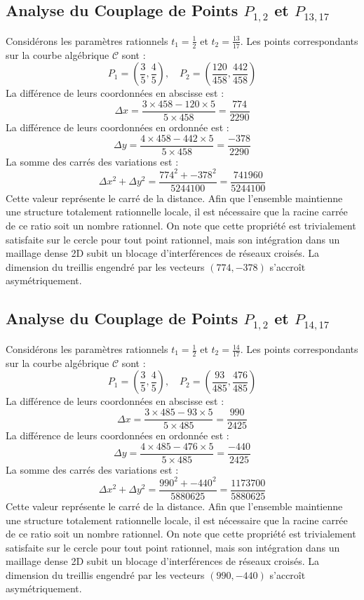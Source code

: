 \documentclass[12pt, a4paper]{article}
\begin{document}
\subsection{Analyse du Couplage de Points $P_{1,2}$ et $P_{13,17}$}
Considérons les paramètres rationnels $t_1 = \frac{1}{2}$ et $t_2 = \frac{13}{17}$.
Les points correspondants sur la courbe algébrique $\mathcal{C}$ sont :
$$ P_1 = \left( \frac{3}{5}, \frac{4}{5} \right), \quad P_2 = \left( \frac{120}{458}, \frac{442}{458} \right) $$
La différence de leurs coordonnées en abscisse est :
$$ \Delta x = \frac{3 \times 458 - 120 \times 5}{5 \times 458} = \frac{774}{2290} $$
La différence de leurs coordonnées en ordonnée est :
$$ \Delta y = \frac{4 \times 458 - 442 \times 5}{5 \times 458} = \frac{-378}{2290} $$
La somme des carrés des variations est :
$$ \Delta x^2 + \Delta y^2 = \frac{ 774^2 + -378^2 }{ 5244100 } = \frac{ 741960 }{ 5244100 } $$
Cette valeur représente le carré de la distance. Afin que l'ensemble maintienne une structure totalement rationnelle locale, il est nécessaire que la racine carrée de ce ratio soit un nombre rationnel. On note que cette propriété est trivialement satisfaite sur le cercle pour tout point rationnel, mais son intégration dans un maillage dense 2D subit un blocage d'interférences de réseaux croisés. La dimension du treillis engendré par les vecteurs $( 774, -378 )$ s'accroît asymétriquement.


\subsection{Analyse du Couplage de Points $P_{1,2}$ et $P_{14,17}$}
Considérons les paramètres rationnels $t_1 = \frac{1}{2}$ et $t_2 = \frac{14}{17}$.
Les points correspondants sur la courbe algébrique $\mathcal{C}$ sont :
$$ P_1 = \left( \frac{3}{5}, \frac{4}{5} \right), \quad P_2 = \left( \frac{93}{485}, \frac{476}{485} \right) $$
La différence de leurs coordonnées en abscisse est :
$$ \Delta x = \frac{3 \times 485 - 93 \times 5}{5 \times 485} = \frac{990}{2425} $$
La différence de leurs coordonnées en ordonnée est :
$$ \Delta y = \frac{4 \times 485 - 476 \times 5}{5 \times 485} = \frac{-440}{2425} $$
La somme des carrés des variations est :
$$ \Delta x^2 + \Delta y^2 = \frac{ 990^2 + -440^2 }{ 5880625 } = \frac{ 1173700 }{ 5880625 } $$
Cette valeur représente le carré de la distance. Afin que l'ensemble maintienne une structure totalement rationnelle locale, il est nécessaire que la racine carrée de ce ratio soit un nombre rationnel. On note que cette propriété est trivialement satisfaite sur le cercle pour tout point rationnel, mais son intégration dans un maillage dense 2D subit un blocage d'interférences de réseaux croisés. La dimension du treillis engendré par les vecteurs $( 990, -440 )$ s'accroît asymétriquement.
\end{document}
